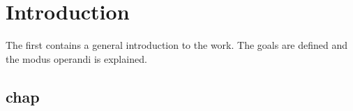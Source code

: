 \chapter{Introduction}
\label{cha:intro}
The first contains a general introduction to the work. The goals are
defined and the modus operandi is explained.

\section{chap}

